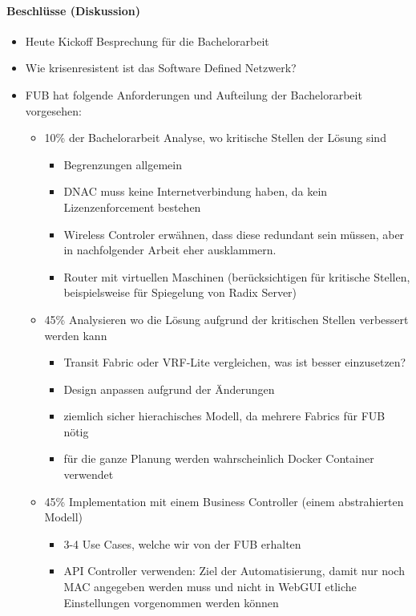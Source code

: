 \paragraph{Beschlüsse (Diskussion)}
\begin{itemize}	
	\item Heute Kickoff Besprechung für die Bachelorarbeit
	\item Wie krisenresistent ist das Software Defined Netzwerk?
	\item FUB hat folgende Anforderungen und Aufteilung der Bachelorarbeit vorgesehen:
	\begin{itemize}
		\item 10\% der Bachelorarbeit Analyse, wo kritische Stellen der Lösung sind
		\begin{itemize}
			\item Begrenzungen allgemein
			\item DNAC muss keine Internetverbindung haben, da kein Lizenzenforcement bestehen
			\item Wireless Controler erwähnen, dass diese redundant sein müssen, aber in nachfolgender Arbeit eher ausklammern.
			\item Router mit virtuellen Maschinen (berücksichtigen für kritische Stellen, beispielsweise für Spiegelung von Radix Server)
		\end{itemize}
		\item 45\% Analysieren wo die Lösung aufgrund der kritischen Stellen verbessert werden kann
		\begin{itemize}
			\item Transit Fabric oder VRF-Lite vergleichen, was ist besser einzusetzen?
			\item Design anpassen aufgrund der Änderungen
			\item ziemlich sicher hierachisches Modell, da mehrere Fabrics für FUB nötig
			\item für die ganze Planung werden wahrscheinlich Docker Container verwendet
		\end{itemize}
		\item 45\% Implementation mit einem Business Controller (einem abstrahierten Modell)
		\begin{itemize}
			\item 3-4 Use Cases, welche wir von der FUB erhalten
			\item API Controller verwenden: Ziel der Automatisierung, damit nur noch MAC angegeben werden muss und nicht in WebGUI etliche Einstellungen vorgenommen werden können
		\end{itemize}

\end{itemize}
\end{itemize}
